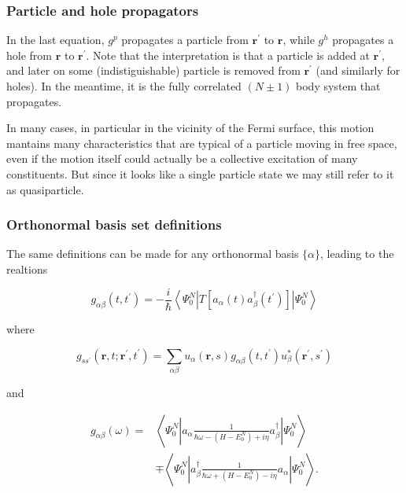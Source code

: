 \documentclass[compress]{beamer}
\begin{document}
\frame
{
\frametitle{Particle and hole propagators}
\begin{small}
{\scriptsize

In the last equation, $g^{p}$ propagates a particle from
$\mathbf{r}^{\prime}$ to $\mathbf{r}$, while $g^{h}$ propagates a hole
from $\mathbf{r}$ to $\mathbf{r}^{\prime}$. Note that the
interpretation is that a particle is added at $\mathbf{r}^{\prime}$,
and later on some (indistiguishable) particle is removed from
$\mathbf{r}^{\prime}$ (and similarly for holes). In the meantime, it
is the fully correlated $(N \pm 1)$ body system that propagates.

In many cases,  in particular in
the vicinity of the Fermi surface, this motion mantains many
characteristics that are typical of a particle moving in free space,
even if the motion itself could actually be a collective excitation of
many constituents. But since it looks like a single particle state we
may still refer to it as quasiparticle.

}
\end{small}
}
\frame
{
\frametitle{Orthonormal basis set definitions}
\begin{small}
{\scriptsize

The same definitions can be made for any orthonormal basis $\{\alpha\}$, leading to the realtions

$$
g_{\alpha \beta}\left(t, t^{\prime}\right)=-\frac{i}{\hbar}\left\langle\Psi_{0}^{N}\left|T\left[a_{\alpha}(t) a_{\beta}^{\dagger}\left(t^{\prime}\right)\right]\right| \Psi_{0}^{N}\right\rangle
$$

where

$$
g_{s s^{\prime}}\left(\mathbf{r}, t ; \mathbf{r}^{\prime}, t^{\prime}\right)=\sum_{\alpha \beta} u_{\alpha}(\mathbf{r}, s) g_{\alpha \beta}\left(t, t^{\prime}\right) u_{\beta}^{*}\left(\mathbf{r}^{\prime}, s^{\prime}\right)
$$

and

$$
\begin{aligned}
g_{\alpha \beta}(\omega)= & \left\langle\Psi_{0}^{N}\left|a_{\alpha} \frac{1}{\hbar \omega-\left(H-E_{0}^{N}\right)+i \eta} a_{\beta}^{\dagger}\right| \Psi_{0}^{N}\right\rangle \\
& \mp\left\langle\Psi_{0}^{N}\left|a_{\beta}^{\dagger} \frac{1}{\hbar \omega+\left(H-E_{0}^{N}\right)-i \eta} a_{\alpha}\right| \Psi_{0}^{N}\right\rangle .
\end{aligned}
$$

}
\end{small}
}
\end{document}
